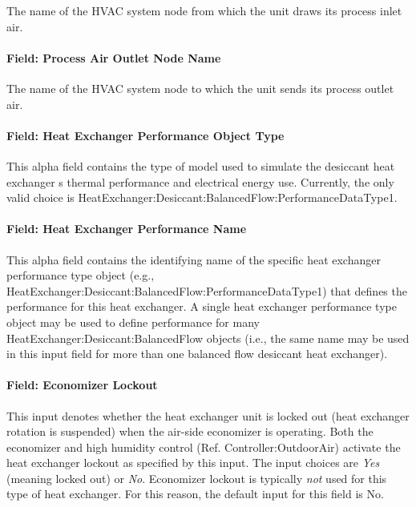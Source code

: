 The name of the HVAC system node from which the unit draws its process inlet air.

\paragraph{Field: Process Air Outlet Node Name}\label{field-process-air-outlet-node-name-000}

The name of the HVAC system node to which the unit sends its process outlet air.

\paragraph{Field: Heat Exchanger Performance Object Type}\label{field-heat-exchanger-performance-object-type}

This alpha field contains the type of model used to simulate the desiccant heat exchanger s thermal performance and electrical energy use. Currently, the only valid choice is HeatExchanger:Desiccant:BalancedFlow:PerformanceDataType1.

\paragraph{Field: Heat Exchanger Performance Name}\label{field-heat-exchanger-performance-name}

This alpha field contains the identifying name of the specific heat exchanger performance type object (e.g., HeatExchanger:Desiccant:BalancedFlow:PerformanceDataType1) that defines the performance for this heat exchanger. A single heat exchanger performance type object may be used to define performance for many HeatExchanger:Desiccant:BalancedFlow objects (i.e., the same name may be used in this input field for more than one balanced flow desiccant heat exchanger).

\paragraph{Field: Economizer Lockout}\label{field-economizer-lockout-2}

This input denotes whether the heat exchanger unit is locked out (heat exchanger rotation is suspended) when the air-side economizer is operating. Both the economizer and high humidity control (Ref. Controller:OutdoorAir) activate the heat exchanger lockout as specified by this input. The input choices are \emph{Yes} (meaning locked out) or \emph{No}. Economizer lockout is typically \emph{not} used for this type of heat exchanger. For this reason, the default input for this field is No.

